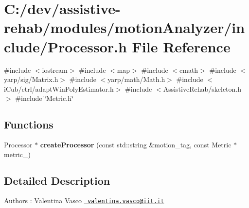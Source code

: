 \section{C\+:/dev/assistive-\/rehab/modules/motion\+Analyzer/include/\+Processor.h File Reference}
\label{Processor_8h}
{\ttfamily \#include $<$iostream$>$}\newline
{\ttfamily \#include $<$map$>$}\newline
{\ttfamily \#include $<$cmath$>$}\newline
{\ttfamily \#include $<$yarp/sig/\+Matrix.\+h$>$}\newline
{\ttfamily \#include $<$yarp/math/\+Math.\+h$>$}\newline
{\ttfamily \#include $<$i\+Cub/ctrl/adapt\+Win\+Poly\+Estimator.\+h$>$}\newline
{\ttfamily \#include $<$Assistive\+Rehab/skeleton.\+h$>$}\newline
{\ttfamily \#include \char`\"{}Metric.\+h\char`\"{}}\newline
\subsection*{Functions}
\begin{DoxyCompactItemize}
\item 
\mbox{\label{Processor_8h_ae96c2a244bf8ddffae9b0f04eea64b0f}} 
Processor $\ast$ {\bfseries create\+Processor} (const std\+::string \&motion\+\_\+tag, const Metric $\ast$metric\+\_\+)
\end{DoxyCompactItemize}


\subsection{Detailed Description}
\begin{DoxyAuthor}{Authors}
\+: Valentina Vasco \href{mailto:valentina.vasco@iit.it}{\texttt{ valentina.\+vasco@iit.\+it}} 
\end{DoxyAuthor}
